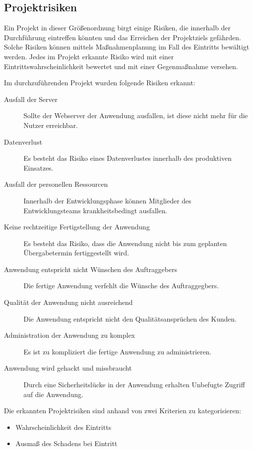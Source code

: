 \subsection{Projektrisiken}
\label{sec:Projektrisiken}

Ein Projekt in dieser Größenordnung birgt einige Risiken, die innerhalb der
Durchführung eintreffen könnten und das Erreichen der Projektziels gefährden.
Solche Risiken können mittels Maßnahmenplanung im Fall des Eintritts bewältigt
werden. Jedes im Projekt erkannte Risiko wird mit einer
Eintrittswahrscheinlichkeit bewertet und mit einer Gegenmaßnahme versehen.

Im durchzuführenden Projekt wurden folgende Risiken erkannt:

\begin{description}
\item[Ausfall der Server]
Sollte der Webserver der Anwendung ausfallen, ist diese nicht mehr für die Nutzer
erreichbar.
\item[Datenverlust]
Es besteht das Risiko eines Datenverlustes innerhalb des produktiven Einsatzes.
\item[Ausfall der personellen Ressourcen]
Innerhalb der Entwicklungsphase können Mitglieder des Entwicklungsteams
krankheitsbedingt ausfallen.
\item[Keine rechtzeitige Fertigstellung der Anwendung]
Es besteht das Risiko, dass die Anwendung nicht bis zum geplanten Übergabetermin
fertiggestellt wird.
\item[Anwendung entspricht nicht Wünschen des Auftraggebers]
Die fertige Anwendung verfehlt die Wünsche des Auftraggegbers.
\item[Qualität der Anwendung nicht ausreichend]
Die Anwendung entspricht nicht den Qualitätsansprüchen des Kunden.
\item[Administration der Anwendung zu komplex]
Es ist zu kompliziert die fertige Anwendung zu administrieren.
\item[Anwendung wird gehackt und missbraucht]
Durch eine Sicherheitslücke in der Anwendung erhalten Unbefugte Zugriff auf die
Anwendung. 
\end{description}

Die erkannten Projektrisiken sind anhand von zwei Kriterien zu kategorisieren:

\begin{itemize}
\item Wahrscheinlichkeit des Eintritts
\item Ausmaß des Schadens bei Eintritt 
\end{itemize}

